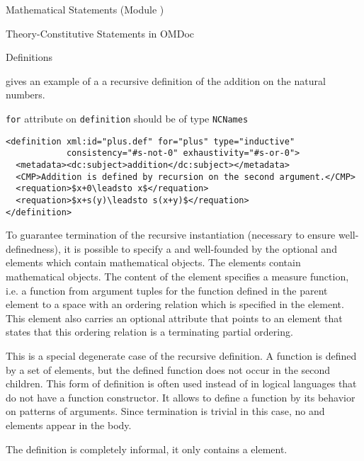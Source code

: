 \begin{tchapter}[id=statements,short=Mathematical Statements]{Mathematical Statements (Module {})}
\begin{tsection}[id=definitions]{Theory-Constitutive Statements in OMDoc}
\begin{tsubsection}[id=definitions]{Definitions}
\begin{description}
  {} gives an example of a a recursive definition of
  the addition on the natural numbers.
\begin{erratum}[reported-by=Michael Kohlhase,date=2009-08-11]{{\texttt{for}} attribute on
    {\texttt{definition}} should be of type {\texttt{NCNames}}}
\begin{lstlisting}[label=lst:recursive,mathescape,
  caption={A recursive definition of addition},
  index={definition,requation}]
<definition xml:id="plus.def" for="plus" type="inductive" 
            consistency="#s-not-0" exhaustivity="#s-or-0">
  <metadata><dc:subject>addition</dc:subject></metadata>
  <CMP>Addition is defined by recursion on the second argument.</CMP>
  <requation>$x+0\leadsto x$</requation>
  <requation>$x+s(y)\leadsto s(x+y)$</requation>
</definition>
\end{lstlisting}
\end{erratum}
To guarantee termination of the recursive instantiation (necessary to ensure
  well-definedness), it is possible to specify a {} and
  well-founded {} by the optional {} and
  {} elements which contain mathematical objects. The elements contain
  mathematical objects. The content of the {} element specifies a measure
  function, i.e. a function from argument tuples for the function defined in the parent
  {} element to a space with an ordering relation which is specified
  in the {} element. This element also carries an optional attribute
  {} that points to an {} element that states
  that this ordering relation is a terminating partial ordering.
\item[{\attval{pattern}{type}{definition}}] This is a special degenerate case of the
  recursive definition. A function is defined by a set of {} elements,
  but the defined function does not occur in the second children. This form of definition
  is often used instead of {} in logical languages that
  do not have a function constructor. It allows to define a function by its behavior on
  patterns of arguments. Since termination is trivial in this case, no {}
  and {} elements appear in the body.
\item[{\attval{informal}{type}{definition}}] The definition is completely informal, it
  only contains a {} element.
\end{description}
\end{tsubsection}
\end{tsection}


\end{tchapter}
